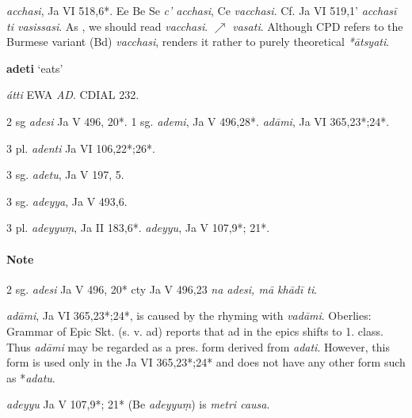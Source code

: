 \documentclass[11pt]{article}
\newcommand*\ṛ{r\symbol{"325}}
\newcommand*\Ṛ{R\symbol{"325}}
\newcommand*\ṝ{r\symbol{"304}\symbol{"325}}
\newcommand*\Ṝ{R\symbol{"304}\symbol{"325}}
\newcommand*\ḷ{l\symbol{"325}}
\newcommand*\ḹ{l\symbol{"304}\symbol{"325}}
\newcommand*\Ḷ{L\symbol{"325}}
\newcommand*\Ḹ{L\symbol{"304}\symbol{"325}}
\begin{document}

\textit{acchasi}, Ja VI 518,6*. Ee Be Se \textit{c' acchasi}, Ce \textit{vacchasi}.
Cf. Ja VI 519,1' \textit{acchasī ti vasissasi}. As \citet[39]{alsdorf:57}, we should read \textit{vacchasi}. $\nearrow$ \textit{vasati}.
Although CPD refers to the Burmese variant (Bd) \textit{vacchasi},
renders it rather to purely theoretical \textit{*ātsyati}.

%
% 
\begin{center}
{\Large
\textbf{adeti} `eats'
}
\end{center}
\begin{description}[leftmargin=\parindent]
\item[skt.] \textit{átti} EWA \textit{AD}. CDIAL 232.
\end{description}

\begin{description}[leftmargin=\parindent]
\item[pres.] 2 sg \textit{adesi} Ja V 496, 20*.
1 sg. \textit{ademi}, Ja V 496,28*.
\textit{adāmi}, Ja VI 365,23*;24*.

3 pl. \textit{adenti} Ja VI 106,22*;26*.
\item[imper.]
3 sg. \textit{adetu}, Ja V 197, 5.
\item[opt.]
3 sg. \textit{adeyya}, Ja V 493,6.

3 pl. \textit{adeyyuṃ}, Ja II 183,6*.
\textit{adeyyu}, Ja V 107,9*; 21*.
\end{description}

\paragraph*{Note}
2 sg. \textit{adesi} Ja V 496, 20* cty Ja V 496,23 \textit{na adesi, mā khādī ti}.

\textit{adāmi}, Ja VI 365,23*;24*, is caused by the rhyming with \textit{vadāmi}.
Oberlies: Grammar of Epic Skt. (s. v. ad) reports that ad in the epics shifts to 1. class.
Thus \textit{adāmi} may be regarded as a pres. form derived from \textit{adati}.
However, this form is used only in the Ja VI 365,23*;24* and does not have any other form such as *\textit{adatu}.

\textit{adeyyu} Ja V 107,9*; 21* (Be \textit{adeyyuṃ}) is \textit{metri causa}.
\end{document}
